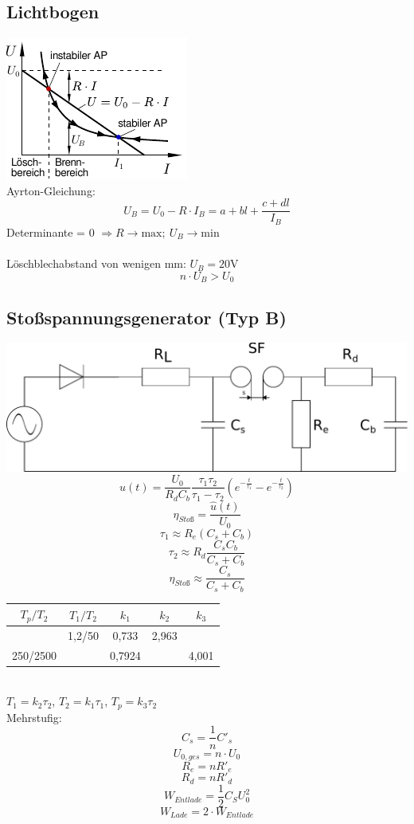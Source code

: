 \documentclass[9pt,a4paper]{scrartcl}
\newcommand{\ra}[0]{\ensuremath{\rightarrow}} 									%
\begin{document}
\begin{multicols}{3}
		\subsection{Lichtbogen}
		\includegraphics[scale=1.4]{./img/Lichtbogen.pdf}\\
		Ayrton-Gleichung: 
		\[U_B = U_0 - R \cdot I_B = a + bl + \frac{c+dl}{I_B}\]
		Determinante = 0 $\Rightarrow R \ra \text{max};\ U_{B} \ra \text{min}$\\
		\\
		Löschblechabstand von wenigen mm: $U_B = 20$V
		\[n \cdot U_B > U_0\]

		\subsection{Stoßspannungsgenerator (Typ B)}
		\includegraphics[scale=0.4]{./img/stossspannungsgenerator_einstufig_schaltung_b.pdf}\\
		\[u(t) = \frac{U_0}{R_d C_b} \frac{\tau_1 \tau_2}{\tau_1 - \tau_2} \left(e^{-\frac{t}{\tau_1}} - e^{-\frac{t}{\tau_2}} \right)\]
		\[\eta_{Stoß} = \frac{\hat u(t)}{U_0}\]
		\[\tau_1 \approx R_e (C_s + C_b)\]
		\[\tau_2 \approx R_d \frac{C_s C_b}{C_s + C_b}\]
		\[\eta_{Stoß} \approx \frac{C_s}{C_s + C_b}\]
		\begin{tabular}{c|c|c|c|c}
		$T_p/T_2$ & $T_1/T_2$ & $k_1$ & $k_2$ & $k_3$ \\ \hline
		& 1,2/50 & 0,733 & 2,963 & \\ \hline
		250/2500 & & 0,7924 & & 4,001
		\end{tabular} \\
		$T_1 = k_2 \tau_2$, $T_2 = k_1 \tau_1$, $T_p = k_3 \tau_2$ \\
		Mehrstufig:\\
		\[C_s = \frac{1}{n} C'_s\]
		\[U_{0,ges} = n \cdot U_0\]
		\[R_e = n R'_e\]
		\[R_d = n R'_d\]
		\[W_{Entlade} = \frac{1}{2} C_S U_0^2\]
		\[W_{Lade} = 2 \cdot W_{Entlade}\]


\end{multicols}
\end{document}
